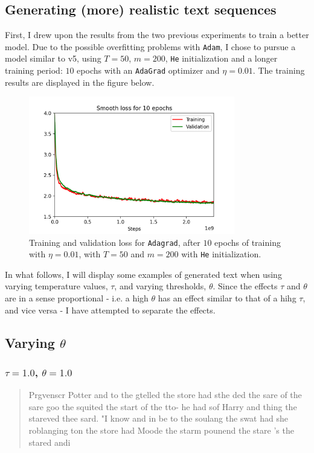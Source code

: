 \documentclass{article}
\begin{document}
\subsection*{Generating (more) realistic text sequences}
	First, I drew upon the results from the two previous experiments to train a better model. Due to the possible overfitting problems with \texttt{Adam}, I chose to pursue a model similar to v5, using $T=50$, $m=200$, \texttt{He} initialization and a longer training period: $10$ epochs with an \texttt{AdaGrad} optimizer and $\eta = 0.01$. The training results are displayed in the figure below.
	\begin{figure}[h!]
		\centering
		\includegraphics[width=9cm]{../plots/rnn_loss_v7.png}
		\caption{Training and validation loss for \texttt{Adagrad}, after $10$ epochs of training with $\eta = 0.01$, with $T = 50$ and $m = 200$ with \texttt{He} initialization.}
 	\end{figure}
	In what follows, I will display some examples of generated text when using varying temperature values, $\tau$, and varying thresholds, $\theta$. Since the effects $\tau$ and $\theta$ are in a sense proportional - i.e. a high $\theta$ has an effect similar to that of a hihg $\tau$, and vice versa - I have attempted to separate the effects.

\subsection*{Varying $\theta$}
\subsubsection*{$\tau=1.0$, $\theta=1.0$}
	\begin{quote}
		Prgvenscr Potter and to the gtelled the store had sthe ded the sare of the sare goo the squited the start of the tto- he had sof Harry and thing the stareved thee sard.  "I know and in be to the soulang the swat had she roblanging ton the store had Moode the starm pounend the stare 's the stared andi
	\end{quote}
\end{document}

